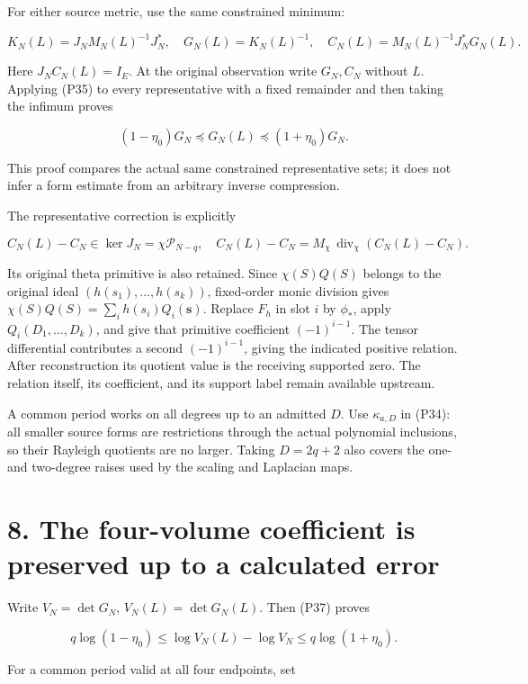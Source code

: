 \documentclass[
]{article}
\begin{document}
For either source metric, use the same constrained minimum:

\[
K_N(L)=J_NM_N(L)^{-1}J_N^*,\quad
G_N(L)=K_N(L)^{-1},\quad
C_N(L)=M_N(L)^{-1}J_N^*G_N(L).
\tag{P36}
\]

Here \(J_NC_N(L)=I_E\). At the original observation write \(G_N,C_N\)
without \(L\). Applying (P35) to every representative with a fixed
remainder and then taking the infimum proves

\[
\boxed{(1-\eta_0)G_N\preceq G_N(L)\preceq(1+\eta_0)G_N.}
\tag{P37}
\]

This proof compares the actual same constrained representative sets; it
does not infer a form estimate from an arbitrary inverse compression.

The representative correction is explicitly

\[
C_N(L)-C_N\in\ker J_N=\chi\mathcal P_{N-q},
\quad
C_N(L)-C_N=M_\chi\,\operatorname{div}_\chi(C_N(L)-C_N).
\tag{P38}
\]

Its original theta primitive is also retained. Since \(\chi(S)Q(S)\)
belongs to the original ideal \((h(s_1),\ldots,h(s_k))\), fixed-order
monic division gives \(\chi(S)Q(S)=\sum_i h(s_i)Q_i(\mathbf s)\).
Replace \(F_h\) in slot \(i\) by \(\phi_*\), apply
\(Q_i(D_1,\ldots,D_k)\), and give that primitive coefficient
\((-1)^{i-1}\). The tensor differential contributes a second
\((-1)^{i-1}\), giving the indicated positive relation. After
reconstruction its quotient value is the receiving supported zero. The
relation itself, its coefficient, and its support label remain available
upstream.

A common period works on all degrees up to an admitted \(D\). Use
\(\kappa_{a,D}\) in (P34): all smaller source forms are restrictions
through the actual polynomial inclusions, so their Rayleigh quotients
are no larger. Taking \(D=2q+2\) also covers the one- and two-degree
raises used by the scaling and Laplacian maps.

\section{8. The four-volume coefficient is preserved up to a calculated
error}\label{the-four-volume-coefficient-is-preserved-up-to-a-calculated-error}

Write \(V_N=\det G_N\), \(V_N(L)=\det G_N(L)\). Then (P37) proves

\[
q\log(1-\eta_0)\le
\log V_N(L)-\log V_N
\le q\log(1+\eta_0).
\tag{P39}
\]

For a common period valid at all four endpoints, set
\end{document}

